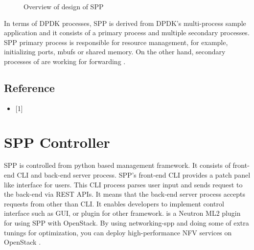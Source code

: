 \documentclass[a4paper,11pt,openany,oneside,english]{sphinxmanual}
\begin{document}
\begin{figure}[htbp]
\centering
\capstart

\noindent{}
\caption{Overview of design of SPP}\label{\detokenize{design/spp:id2}}\label{\detokenize{design/spp:figure-spp-overview-design-all}}\end{figure}

In terms of DPDK processes, SPP is derived from DPDK’s multi-process sample
application and it consists of a primary process and multiple secondary
processes.
SPP primary process is responsible for resource management, for example,
initializing ports, mbufs or shared memory. On the other hand,
secondary processes of  are working for forwarding
.


\subsection{Reference}
\label{\detokenize{design/spp:reference}}\begin{itemize}
\item {} 
{[}1{]} 

\end{itemize}


\section{SPP Controller}
\label{\detokenize{design/spp_controller:spp-controller}}\label{\detokenize{design/spp_controller:spp-overview-spp-controller}}\label{\detokenize{design/spp_controller::doc}}
SPP is controlled from python based management framework. It consists of
front-end CLI and back-end server process.
SPP’s front-end CLI provides a patch panel like interface for users.
This CLI process parses user input and sends request to the back-end via REST
APIs. It means that the back-end server process accepts requests from other
than CLI. It enables developers to implement control interface such as GUI, or
plugin for other framework.
is a Neutron ML2 plugin for using SPP with OpenStack.
By using networking-spp and doing some of extra tunings for optimization, you
can deploy high-performance NFV services on OpenStack
.
\end{document}

